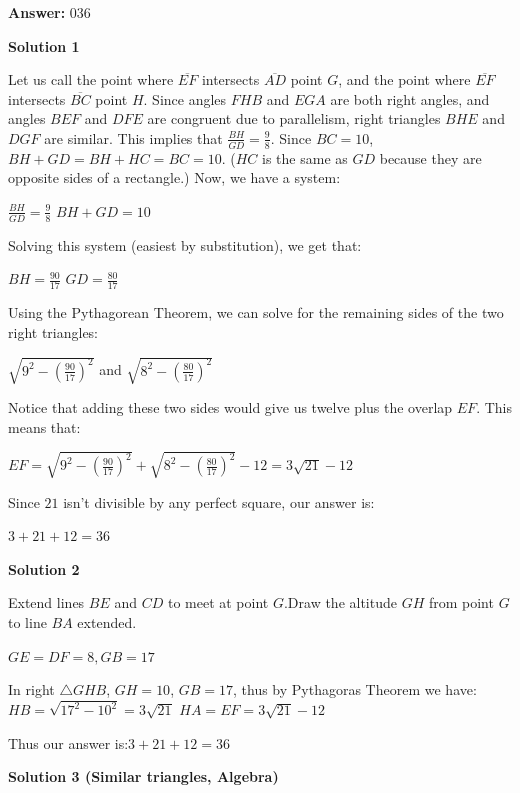 \begin{enumerate}
 
 \textbf{Answer: }036



\textbf{Solution 1}

Let us call the point where $\overline{EF}$ intersects $\overline{AD}$ point $G$, and the point where $\overline{EF}$ intersects $\overline{BC}$ point $H$. Since angles $FHB$ and $EGA$ are both right angles, and angles $BEF$ and $DFE$ are congruent due to parallelism, right triangles $BHE$ and $DGF$ are similar. This implies that $\frac{BH}{GD} = \frac{9}{8}$. Since $BC=10$, $BH+GD=BH+HC=BC=10$. ($HC$ is the same as $GD$ because they are opposite sides of a rectangle.) Now, we have a system:

 $\frac{BH}{GD}=\frac{9}8$
$BH+GD=10$

 Solving this system (easiest by substitution), we get that:

 $BH=\frac{90}{17}$
$GD=\frac{80}{17}$

 Using the Pythagorean Theorem, we can solve for the remaining sides of the two right triangles:

 $\sqrt{9^2-\left(\frac{90}{17}\right)^2}$ and $\sqrt{8^2-\left(\frac{80}{17}\right)^2}$

 Notice that adding these two sides would give us twelve plus the overlap $EF$. This means that:

 $EF= \sqrt{9^2-\left(\frac{90}{17}\right)^2}+\sqrt{8^2-\left(\frac{80}{17}\right)^2}-12=3\sqrt{21}-12$

 Since $21$ isn't divisible by any perfect square, our answer is:

 $3+21+12=\boxed{36}$




\textbf{Solution 2}

Extend lines $BE$ and $CD$ to meet at point $G$.Draw the altitude $GH$ from point $G$ to line $BA$ extended.

 $GE=DF=8,$$GB=17$

 In right $\bigtriangleup GHB$, $GH=10$, $GB=17$, thus by Pythagoras Theorem we have:$HB=\sqrt{17^2-10^2}=3\sqrt{21}$
$HA=EF=3\sqrt{21}-12$

 Thus our answer is:$3+21+12=\boxed{36}$




\textbf{Solution 3 (Similar triangles, Algebra)}


\end{enumerate}
